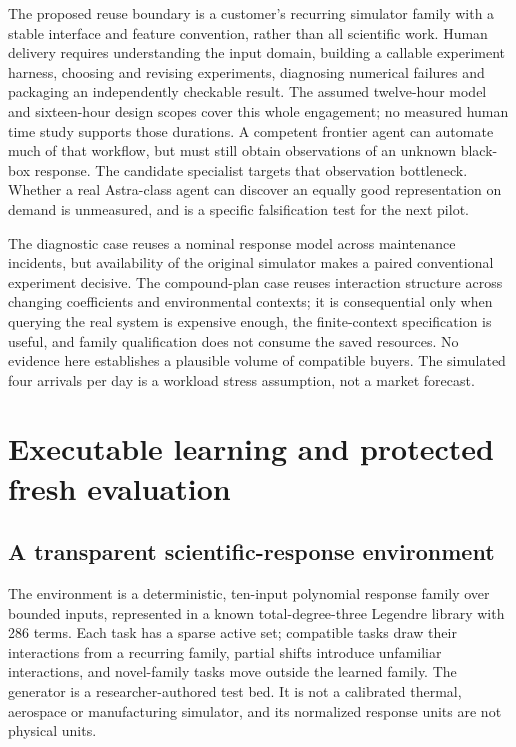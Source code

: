 \documentclass[11pt,letterpaper]{article}
\begin{document}
The proposed reuse boundary is a customer's recurring simulator family with a stable interface and feature convention, rather than all scientific work. Human delivery requires understanding the input domain, building a callable experiment harness, choosing and revising experiments, diagnosing numerical failures and packaging an independently checkable result. The assumed twelve-hour model and sixteen-hour design scopes cover this whole engagement; no measured human time study supports those durations. A competent frontier agent can automate much of that workflow, but must still obtain observations of an unknown black-box response. The candidate specialist targets that observation bottleneck. Whether a real Astra-class agent can discover an equally good representation on demand is unmeasured, and is a specific falsification test for the next pilot.

The diagnostic case reuses a nominal response model across maintenance incidents, but availability of the original simulator makes a paired conventional experiment decisive. The compound-plan case reuses interaction structure across changing coefficients and environmental contexts; it is consequential only when querying the real system is expensive enough, the finite-context specification is useful, and family qualification does not consume the saved resources. No evidence here establishes a plausible volume of compatible buyers. The simulated four arrivals per day is a workload stress assumption, not a market forecast.

\section{Executable learning and protected fresh evaluation}

\subsection{A transparent scientific-response environment}

The environment is a deterministic, ten-input polynomial response family over bounded inputs, represented in a known total-degree-three Legendre library with 286 terms. Each task has a sparse active set; compatible tasks draw their interactions from a recurring family, partial shifts introduce unfamiliar interactions, and novel-family tasks move outside the learned family. The generator is a researcher-authored test bed. It is not a calibrated thermal, aerospace or manufacturing simulator, and its normalized response units are not physical units.
\end{document}
